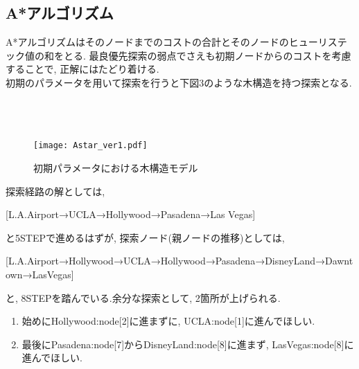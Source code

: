 \documentclass[uplatex,12pt]{jsarticle}
\begin{document}
\subsection{A*アルゴリズム}
A*アルゴリズムはそのノードまでのコストの合計とそのノードのヒューリステック値の和をとる. 最良優先探索の弱点でさえも初期ノードからのコストを考慮することで, 正解にはたどり着ける.\\

初期のパラメータを用いて探索を行うと下図3のような木構造を持つ探索となる.\\\\\\\\
\begin{figure}[htbp]
 \begin{center}
  \texttt{[image: Astar\_ver1.pdf]}
 \end{center}
 \caption[]{初期パラメータにおける木構造モデル}\label{fig:fig1.3}
\end{figure}

探索経路の解としては,
\begin{center}
[L.A.Airport→UCLA→Hollywood→Pasadena→Las Vegas]
\end{center}
と5STEPで進めるはずが, 探索ノード(親ノードの推移)としては,
\begin{center}
[L.A.Airport→Hollywood→UCLA→Hollywood→Pasadena→DisneyLand→Dawntown→LasVegas]
\end{center}
と, 8STEPを踏んでいる.余分な探索として, 2箇所が上げられる.
\begin{enumerate}
 \item 始めにHollywood:node[2]に進まずに, UCLA:node[1]に進んでほしい.
 \item 最後にPasadena:node[7]からDisneyLand:node[8]に進まず, LasVegas:node[8]に進んでほしい.
\end{enumerate}
\end{document}
